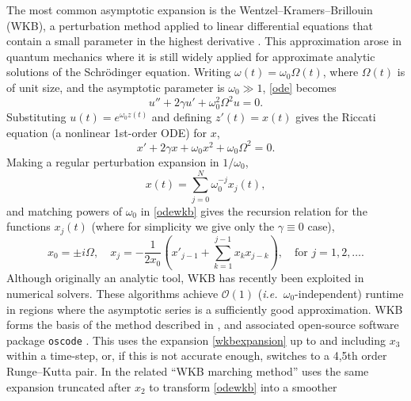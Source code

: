 \documentclass[10pt]{article}
\newcommand{\be}{\begin{equation}}
\newcommand{\ee}{\end{equation}}
\newcommand{\ie}{{\it i.e.\ }}
\newcommand{\bigO}{{\mathcal O}}
\newcommand{\om}{\omega}
\begin{document}
The most common asymptotic expansion
is the Wentzel--Kramers--Brillouin (WKB), a
perturbation method applied to linear differential equations that contain a
small parameter
in the highest derivative
\cite{benderorszag,logan}.
This approximation arose in quantum mechanics where it is still widely
applied for approximate analytic solutions of the Schr\"{o}dinger equation.
Writing $\om(t) = \om_0\Omega(t)$,
where $\Omega(t)$ is of unit size, and the asymptotic parameter is
$\om_0 \gg 1$,    %
\cref{ode} becomes
\be\label{odewkb}
u'' + 2\gamma u' + \om_0^2 \Omega^2 u = 0.
\ee
Substituting $u(t) = e^{\om_0 z(t)}$ and defining $z'(t) = x(t)$
gives the Riccati equation (a nonlinear 1st-order ODE) for $x$, 
\be\label{riccwkb}
x' + 2\gamma x + \om_0 x^2 + \om_0 \Omega^2 = 0.
\ee
Making a regular perturbation expansion in $1/\om_0$,
\be\label{wkbexpansion}
x(t) = \sum_{j=0}^{N} \om_0^{-j} x_j(t),
\ee
and matching powers of $\om_0$ in \cref{odewkb} gives the recursion relation
for the functions $x_j(t)$
(where for simplicity we give only the $\gamma \equiv 0$ case),
\begin{equation}\label{wkbrecur}
  x_0 = \pm i\Omega, \quad x_j = -\frac{1}{2x_0}\left( x'_{j-1} + \sum_{k = 1}^{j-1}x_k x_{j-k} \right), \quad \text{for } j = 1, 2, \ldots.
\end{equation}
Although originally an analytic tool,
WKB has recently been exploited in numerical solvers.
These algorithms achieve
$\bigO(1)$ (\ie $\om_0$-independent) runtime in regions where the asymptotic
series is a sufficiently good approximation.
WKB forms the basis of the method described in
\cite{agocs2020efficient,agocs2020dense}, and associated open-source software
package \texttt{oscode} \cite{agocs2020joss}. This uses the expansion
\cref{wkbexpansion} up to and including $x_3$ within a time-step,
or, if this is not accurate enough, switches to a 4,5th
order Runge--Kutta pair.
In \cite{arnold2011wkb,korner2022wkb} the related
``WKB marching method'' uses the same
expansion truncated after $x_2$ to transform \cref{odewkb} into a smoother
\end{document}
